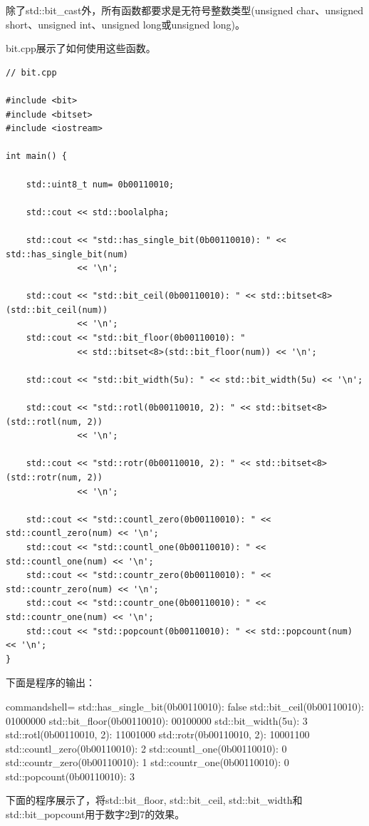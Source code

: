 除了std::bit\_cast外，所有函数都要求是无符号整数类型(unsigned char、unsigned short、unsigned int、unsigned long或unsigned long)。

bit.cpp展示了如何使用这些函数。

\begin{lstlisting}[style=styleCXX]
// bit.cpp

#include <bit>
#include <bitset>
#include <iostream>

int main() {
	
	std::uint8_t num= 0b00110010;
	
	std::cout << std::boolalpha;
	
	std::cout << "std::has_single_bit(0b00110010): " << std::has_single_bit(num)
	          << '\n';
	          
	std::cout << "std::bit_ceil(0b00110010): " << std::bitset<8>(std::bit_ceil(num))
	          << '\n';          
	std::cout << "std::bit_floor(0b00110010): "
	          << std::bitset<8>(std::bit_floor(num)) << '\n';
	
	std::cout << "std::bit_width(5u): " << std::bit_width(5u) << '\n';
	
	std::cout << "std::rotl(0b00110010, 2): " << std::bitset<8>(std::rotl(num, 2))
	          << '\n';
	
	std::cout << "std::rotr(0b00110010, 2): " << std::bitset<8>(std::rotr(num, 2))
	          << '\n';
	          
	std::cout << "std::countl_zero(0b00110010): " << std::countl_zero(num) << '\n';
	std::cout << "std::countl_one(0b00110010): " << std::countl_one(num) << '\n';
	std::cout << "std::countr_zero(0b00110010): " << std::countr_zero(num) << '\n';
	std::cout << "std::countr_one(0b00110010): " << std::countr_one(num) << '\n';
	std::cout << "std::popcount(0b00110010): " << std::popcount(num) << '\n';
}
\end{lstlisting}

下面是程序的输出：

\begin{tcblisting}{commandshell={}}
std::has_single_bit(0b00110010): false
std::bit_ceil(0b00110010): 01000000
std::bit_floor(0b00110010): 00100000
std::bit_width(5u): 3
std::rotl(0b00110010, 2): 11001000
std::rotr(0b00110010, 2): 10001100
std::countl_zero(0b00110010): 2
std::countl_one(0b00110010): 0
std::countr_zero(0b00110010): 1
std::countr_one(0b00110010): 0
std::popcount(0b00110010): 3
\end{tcblisting}

下面的程序展示了，将std::bit\_floor, std::bit\_ceil, std::bit\_width和std::bit\_popcount用于数字2到7的效果。

